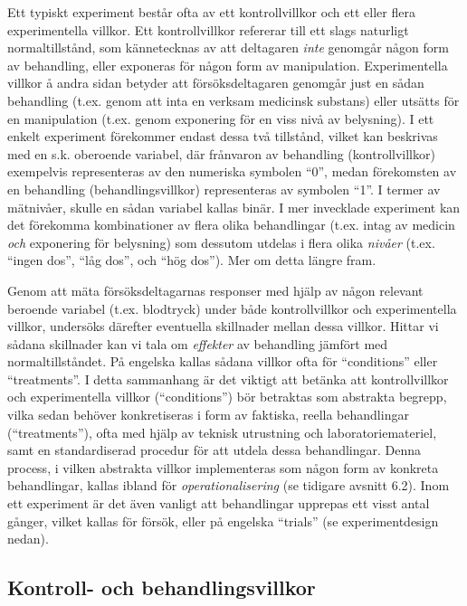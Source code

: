 \documentclass[
]{book}
\begin{document}
Ett typiskt experiment består ofta av ett kontrollvillkor och ett eller flera experimentella villkor. Ett kontrollvillkor refererar till ett slags naturligt normaltillstånd, som kännetecknas av att deltagaren \emph{inte} genomgår någon form av behandling, eller exponeras för någon form av manipulation. Experimentella villkor å andra sidan betyder att försöksdeltagaren genomgår just en sådan behandling (t.ex. genom att inta en verksam medicinsk substans) eller utsätts för en manipulation (t.ex. genom exponering för en viss nivå av belysning). I ett enkelt experiment förekommer endast dessa två tillstånd, vilket kan beskrivas med en s.k. oberoende variabel, där frånvaron av behandling (kontrollvillkor) exempelvis representeras av den numeriska symbolen ``0'', medan förekomsten av en behandling (behandlingsvillkor) representeras av symbolen ``1''. I termer av mätnivåer, skulle en sådan variabel kallas binär. I mer invecklade experiment kan det förekomma kombinationer av flera olika behandlingar (t.ex. intag av medicin \emph{och} exponering för belysning) som dessutom utdelas i flera olika \emph{nivåer} (t.ex. ``ingen dos'', ``låg dos'', och ``hög dos''). Mer om detta längre fram.

Genom att mäta försöksdeltagarnas responser med hjälp av någon relevant beroende variabel (t.ex. blodtryck) under både kontrollvillkor och experimentella villkor, undersöks därefter eventuella skillnader mellan dessa villkor. Hittar vi sådana skillnader kan vi tala om \emph{effekter} av behandling jämfört med normaltillståndet. På engelska kallas sådana villkor ofta för ``conditions'' eller ``treatments''. I detta sammanhang är det viktigt att betänka att kontrollvillkor och experimentella villkor (``conditions'') bör betraktas som abstrakta begrepp, vilka sedan behöver konkretiseras i form av faktiska, reella behandlingar (``treatments''), ofta med hjälp av teknisk utrustning och laboratoriemateriel, samt en standardiserad procedur för att utdela dessa behandlingar. Denna process, i vilken abstrakta villkor implementeras som någon form av konkreta behandlingar, kallas ibland för \emph{operationalisering} (se tidigare avsnitt 6.2). Inom ett experiment är det även vanligt att behandlingar upprepas ett visst antal gånger, vilket kallas för försök, eller på engelska ``trials'' (se experimentdesign nedan).

\hypertarget{sub07.4.1}{%
\subsection{Kontroll- och behandlingsvillkor}\label{sub07.4.1}}
\end{document}
